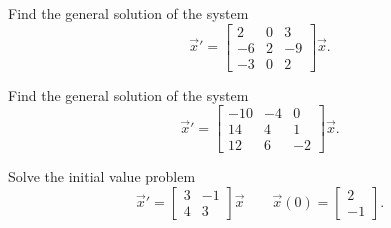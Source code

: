 \begin{exercise}%
Find the general solution of the system
\begin{equation*}
{\vec{x}}' = \begin{bmatrix} 2 & 0 & 3 \\ -6 & 2 & -9 \\ -3 & 0 & 2 \end{bmatrix} \vec{x}.
\end{equation*}
\end{exercise}

\begin{exercise}%
Find the general solution of the system
\begin{equation*}
{\vec{x}}' = \begin{bmatrix} -10 & -4 & 0 \\ 14 & 4 & 1 \\ 12 & 6 & -2 \end{bmatrix} \vec{x}.
\end{equation*}
\end{exercise}

\begin{exercise}
Solve the initial value problem
\[ {\vec{x}}' = \begin{bmatrix} 3 & -1 \\ 4 & 3 \end{bmatrix} \vec{x} \qquad \vec{x}(0) = \begin{bmatrix} 2 \\ -1 \end{bmatrix}. \]
\end{exercise}


